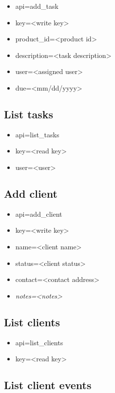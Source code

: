 \documentclass[11pt]{article}
\begin{document}
\begin{itemize}
\item api=add\_task
\item key=<write key>
\item product\_id=<product id>
\item description=<task description>
\item user=<assigned user>
\item due=<mm/dd/yyyy>
\end{itemize}

\subsection{List tasks}

\begin{itemize}
\item api=list\_tasks
\item key=<read key>
\item user=<user>
\end{itemize}

\subsection{Add client}

\begin{itemize}
\item api=add\_client
\item key=<write key>
\item name=<client name>
\item status=<client status>
\item contact=<contact address>
\item \textit{notes=<notes>}
\end{itemize}

\subsection{List clients}

\begin{itemize}
\item api=list\_clients
\item key=<read key>
\end{itemize}

\subsection{List client events}
\end{document}
